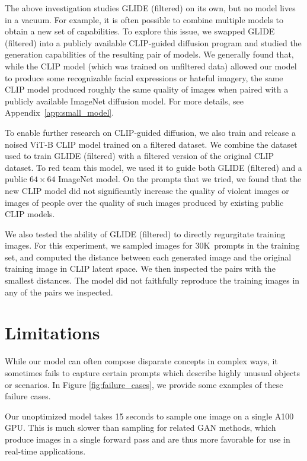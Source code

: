 \documentclass{article}
\newcommand{\modelname}{GLIDE}
\begin{document}
The above investigation studies \modelname{} (filtered) on its own, but no model lives in a vacuum. For example, it is often possible to combine multiple models to obtain a new set of capabilities. To explore this issue, we swapped \modelname{} (filtered) into a publicly available CLIP-guided diffusion program \citep{clipdiff} and studied the generation capabilities of the resulting pair of models. We generally found that, while the CLIP model (which was trained on unfiltered data) allowed our model to produce some recognizable facial expressions or hateful imagery, the same CLIP model produced roughly the same quality of images when paired with a publicly available ImageNet diffusion model. For more details, see Appendix~\ref{app:small_model}.

To enable further research on CLIP-guided diffusion, we also train and release a noised ViT-B CLIP model trained on a filtered dataset. We combine the dataset used to train \modelname{} (filtered) with a filtered version of the original CLIP dataset. To red team this model, we used it to guide both \modelname{} (filtered) and a public $64 \times 64$ ImageNet model. On the prompts that we tried, we found that the new CLIP model did not significantly increase the quality of violent images or images of people over the quality of such images produced by existing public CLIP models.

We also tested the ability of \modelname{} (filtered) to directly regurgitate training images. For this experiment, we sampled images for 30K~prompts in the training set, and computed the distance between each generated image and the original training image in CLIP latent space. We then inspected the pairs with the smallest distances. The model did not faithfully reproduce the training images in any of the pairs we inspected.

\section{Limitations}
\label{sec:limitations}

While our model can often compose disparate concepts in complex ways, it sometimes fails to capture certain prompts which describe highly unusual objects or scenarios. In Figure \ref{fig:failure_cases}, we provide some examples of these failure cases.

Our unoptimized model takes 15 seconds to sample one image on a single A100 GPU. This is much slower than sampling for related GAN methods, which produce images in a single forward pass and are thus more favorable for use in real-time applications.
\end{document}
